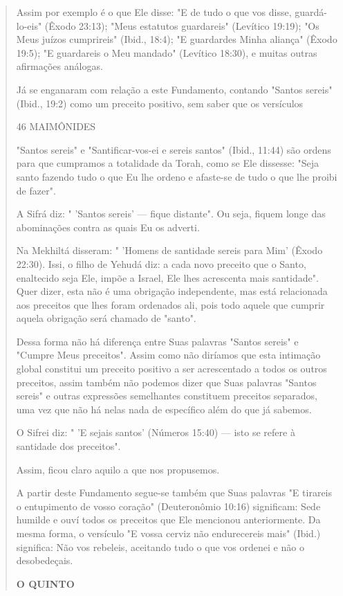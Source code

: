 \begin{quote}
Assim por exemplo é o que Ele disse: "E de tudo o que vos disse,
guardá-lo-eis" (Êxodo 23:13); "Meus estatutos guardareis" (Levítico
19:19); "Os Meus juízos cumprireis" (Ibid., 18:4); "E guardardes Minha
aliança" (Êxodo 19:5); "E guardareis o Meu mandado" (Levítico 18:30), e
muitas outras afirmações aná­logas.

Já se enganaram com relação a este Fundamento, contando "Santos sereis"
(Ibid., 19:2) como um preceito positivo, sem saber que os versículos

46 MAIMÔNIDES

"Santos sereis" e "Santificar-vos-ei e sereis santos" (Ibid., 11:44) são
ordens para que cumpramos a totalidade da Torah, como se Ele dissesse:
"Seja santo fazendo tudo o que Eu lhe ordeno e afaste-se de tudo o que
lhe proibi de fazer".

A Sifrá diz: " 'Santos sereis' --- fique distante". Ou seja, fiquem
lon­ge das abominações contra as quais Eu os adverti.

Na Mekhiltá disseram: " 'Homens de santidade sereis para Mim' (Êxo­do
22:30). Issi, o filho de Yehudá diz: a cada novo preceito que o Santo,
enalte­cido seja Ele, impõe a Israel, Ele lhes acrescenta mais
santidade". Quer dizer, esta não é uma obrigação independente, mas está
relacionada aos preceitos que lhes foram ordenados ali, pois todo aquele
que cumprir aquela obrigação será chamado de "santo".

Dessa forma não há diferença entre Suas palavras "Santos sereis" e
"Cumpre Meus preceitos". Assim como não diríamos que esta intimação
glo­bal constitui um preceito positivo a ser acrescentado a todos os
outros precei­tos, assim também não podemos dizer que Suas palavras
"Santos sereis" e ou­tras expressões semelhantes constituem preceitos
separados, uma vez que não há nelas nada de específico além do que já
sabemos.

O Sifrei diz: " 'E sejais santos' (Números 15:40) --- isto se refere à
santidade dos preceitos".

Assim, ficou claro aquilo a que nos propusemos.

A partir deste Fundamento segue-se também que Suas palavras "E tirareis
o entupimento de vosso coração" (Deuteronômio 10:16) significam: Sede
humilde e ouví todos os preceitos que Ele mencionou anteriormente. Da
mes­ma forma, o versículo "E vossa cerviz não endurecereis mais" (Ibid.)
significa: Não vos rebeleis, aceitando tudo o que vos ordenei e não o
desobedeçais.

\textbf{O QUINTO}


\end{quote}
